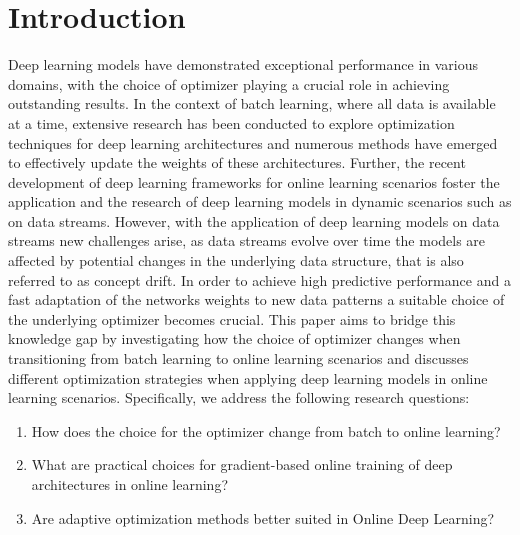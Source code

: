 \documentclass[letterpaper]{article} %
\begin{document}
\section{Introduction}
Deep learning models have demonstrated exceptional performance in various domains, with the choice of optimizer playing a crucial role in achieving outstanding results.
In the context of batch learning, where all data is available at a time, extensive research has been conducted to explore optimization techniques for deep learning architectures and numerous methods have emerged to effectively update the weights of these architectures.
Further, the recent development of deep learning frameworks for online learning scenarios foster the application and the research of deep learning models in dynamic scenarios such as on data streams.
However, with the application of deep learning models on data streams new challenges arise, as data streams evolve over time the models are affected by potential changes in the underlying data structure, that is also referred to as concept drift.
In order to achieve high predictive performance and a fast adaptation of the networks weights to new data patterns a suitable choice of the underlying optimizer becomes crucial.
This paper aims to bridge this knowledge gap by investigating how the choice of optimizer changes when transitioning from batch learning to online learning scenarios and discusses different optimization strategies when applying deep learning models in online learning scenarios.
Specifically, we address the following research questions:
\begin{enumerate}
	\item How does the choice for the optimizer change from batch to online learning?
	\item What are practical choices for gradient-based online training of deep architectures in online learning?
	\item Are adaptive optimization methods better suited in Online Deep Learning?
\end{enumerate}
\end{document}
